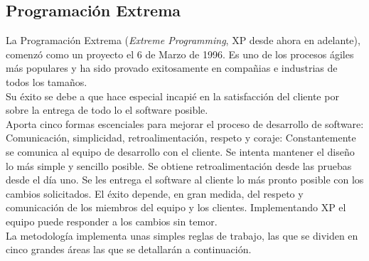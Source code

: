 \subsection{Programación Extrema}
\label{subsec:XP}
La Programación Extrema (\textit{Extreme Programming}, XP desde ahora en adelante), comenzó como un proyecto el 6 de Marzo de 1996. Es uno de los procesos ágiles más populares y ha sido provado exitosamente en compañias e industrias de todos los tamaños.\\
Su éxito se debe a que hace especial incapié en la satisfacción del cliente por sobre la entrega de todo lo el software posible.\\
Aporta cinco formas escenciales para mejorar el proceso de desarrollo de software: Comunicación, simplicidad, retroalimentación, respeto y coraje: Constantemente se comunica al equipo de desarrollo con el cliente. Se intenta mantener el diseño lo más simple y sencillo posible. Se obtiene retroalimentación desde las pruebas desde el día uno. Se les entrega el software al cliente lo más pronto posible con los cambios solicitados. El éxito depende, en gran medida, del respeto y comunicación de los miembros del equipo y los clientes. Implementando XP el equipo puede responder a los cambios sin temor.\\
La metodología implementa unas simples reglas de trabajo, las que se dividen en cinco grandes áreas las que se detallarán a continuación.\\
